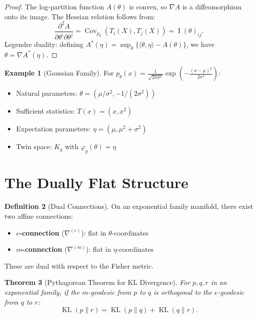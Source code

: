 \documentclass[11pt,twoside]{book}
\theoremstyle{plain}
\newtheorem{theorem}{Theorem}[chapter]
\theoremstyle{definition}
\newtheorem{definition}[theorem]{Definition}
\newtheorem{example}[theorem]{Example}
\theoremstyle{remark}
\newcommand{\Kg}{K_g}
\DeclareMathOperator{\Cov}{Cov}
\DeclareMathOperator{\KL}{KL}
\DeclareMathOperator{\Fisher}{I}
\newcommand{\pp}[2]{\frac{\partial #1}{\partial #2}}
\begin{document}
\begin{proof}
    The log-partition function $A(\theta)$ is convex, so $\nabla A$ is a diffeomorphism onto its image. The Hessian relation follows from:
    \[
    \pp{^2 A}{\theta^i \partial \theta^j} = \Cov_{p_\theta}(T_i(X), T_j(X)) = \Fisher(\theta)_{ij}.
    \]
    Legendre duality: defining $A^*(\eta) = \sup_\theta \{\langle \theta, \eta \rangle - A(\theta)\}$, we have $\theta = \nabla A^*(\eta)$.
\end{proof}

\begin{example}[Gaussian Family]
    For $p_\theta(x) = \frac{1}{\sqrt{2\pi\sigma^2}} \exp\left(-\frac{(x-\mu)^2}{2\sigma^2}\right)$:
    \begin{itemize}
        \item Natural parameters: $\theta = (\mu/\sigma^2, -1/(2\sigma^2))$
        \item Sufficient statistics: $T(x) = (x, x^2)$
        \item Expectation parameters: $\eta = (\mu, \mu^2 + \sigma^2)$
        \item Twin space: $\Kg$ with $\varphi_g(\theta) = \eta$
    \end{itemize}
\end{example}

\section{The Dually Flat Structure}
\label{sec:dual_flat}

\begin{definition}[Dual Connections]
    On an exponential family manifold, there exist two affine connections:
    \begin{itemize}
        \item \textbf{$e$-connection} ($\nabla^{(e)}$): flat in $\theta$-coordinates
        \item \textbf{$m$-connection} ($\nabla^{(m)}$): flat in $\eta$-coordinates
    \end{itemize}
    These are dual with respect to the Fisher metric.
\end{definition}

\begin{theorem}[Pythagorean Theorem for KL Divergence]
    \label{thm:pythagorean}
    For $p, q, r$ in an exponential family, if the $m$-geodesic from $p$ to $q$ is orthogonal to the $e$-geodesic from $q$ to $r$:
    \[
    \KL(p \| r) = \KL(p \| q) + \KL(q \| r).
    \]
\end{theorem}
\end{document}
